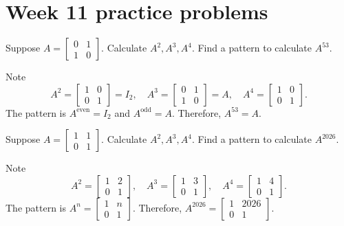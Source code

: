 \documentclass[../main.tex]{subfiles}
\begin{document}
\section{Week 11 practice problems}

\begin{exercise}
  Suppose \(A = \begin{bmatrix} 0 & 1 \\ 1 & 0\end{bmatrix}\). Calculate \(A^{2}, A^{3}, A^{4}\). Find a pattern to calculate \(A^{53}\).

  \begin{solution}
    Note
    \[
      A^{2} = 
      \begin{bmatrix}
        1 & 0 \\
        0 & 1
      \end{bmatrix} = I_{2},
      \quad
      A^{3} = 
      \begin{bmatrix}
        0 & 1 \\
        1 & 0
      \end{bmatrix} = A,
      \quad
      A^{4} = 
      \begin{bmatrix}
        1 & 0 \\
        0 & 1
      \end{bmatrix}.
    \]
    The pattern is \(A^{\text{even}} = I_{2}\) and \(A^{\text{odd}} = A\). Therefore, \(A^{53} = A\).
  \end{solution}
\end{exercise}

\begin{exercise}
  Suppose \(A = \begin{bmatrix} 1 & 1 \\ 0 & 1\end{bmatrix}\). Calculate \(A^{2}, A^{3}, A^{4}\). Find a pattern to calculate \(A^{2026}\).

  \begin{solution}
    Note
    \[
      A^{2} = 
      \begin{bmatrix}
        1 & 2 \\
        0 & 1
      \end{bmatrix},
      \quad
      A^{3} = 
      \begin{bmatrix}
        1 & 3 \\
        0 & 1
      \end{bmatrix},
      \quad
      A^{4} = 
      \begin{bmatrix}
        1 & 4 \\
        0 & 1
      \end{bmatrix}.
    \]
    The pattern is \(A^{n} = \begin{bmatrix} 1 & n \\ 0 & 1 \end{bmatrix}\). Therefore, \(A^{2026} = \begin{bmatrix} 1 & 2026 \\ 0 & 1 \end{bmatrix}\).
  \end{solution}
\end{exercise}
\end{document}
